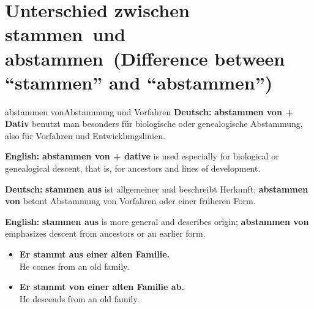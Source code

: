 \documentclass[a4paper,11pt]{article}
\newcommand{\GermanText}[1]{\textbf{Deutsch: }#1\par}
\newcommand{\EnglishText}[1]{{\small\color{SoftGray}\textbf{English: }#1\par}}
\newcommand{\ExampleItem}[2]{\item \textbf{#1}\\{\small\color{SoftGray}#2}}
\begin{document}
\section{Unterschied zwischen \glqq stammen\grqq\ und \glqq abstammen\grqq\ \textnormal{(Difference between ``stammen'' and ``abstammen'')}}
\begin{grammarentry}{abstammen von}{Abstammung und Vorfahren}
\GermanText{\textbf{abstammen von + Dativ} benutzt man besonders für biologische oder genealogische Abstammung, also für Vorfahren und Entwicklungslinien.}
\EnglishText{\textbf{abstammen von + dative} is used especially for biological or genealogical descent, that is, for ancestors and lines of development.}
\GermanText{\textbf{stammen aus} ist allgemeiner und beschreibt Herkunft; \textbf{abstammen von} betont Abstammung von Vorfahren oder einer früheren Form.}
\EnglishText{\textbf{stammen aus} is more general and describes origin; \textbf{abstammen von} emphasizes descent from ancestors or an earlier form.}
\end{grammarentry}
\begin{exbox}
\begin{itemize}
\ExampleItem{Er stammt aus einer alten Familie.}{He comes from an old family.}
\ExampleItem{Er stammt von einer alten Familie ab.}{He descends from an old family.}
\end{itemize}
\end{exbox}
\end{document}
